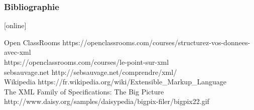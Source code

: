 \documentclass{beamer}
\begin{document}
\begin{frame}
  \frametitle<presentation>{Bibliographie}
    
  \begin{thebibliography}{10}
    
[online]

    \newblock Open ClassRooms
    \newblock https://openclassrooms.com/courses/structurez-vos-donnees-avec-xml\\
https://openclassrooms.com/courses/le-point-sur-xml\\
    \newblock sebsauvage.net
    \newblock http://sebsauvage.net/comprendre/xml/\\
    \newblock Wikipedia
    \newblock https://fr.wikipedia.org/wiki/Extensible\_Markup\_Language
  \beamertemplatearticlebibitems\\
    \newblock The XML Family of Specifications: The Big Picture
    \newblock http://www.daisy.org/samples/daisypedia/bigpix-filer/bigpix22.gif

 
  \end{thebibliography}
\end{frame}
\end{document}
